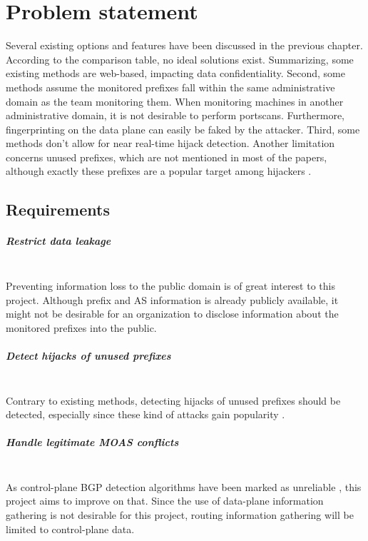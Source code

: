 \chapter{Problem statement}\label{ch:problem}
Several existing options and features have been discussed in the previous chapter. According to the comparison table, no ideal solutions exist. Summarizing, some existing methods are web-based, impacting data confidentiality. Second, some methods assume the monitored prefixes fall within the same administrative domain as the team monitoring them. When monitoring machines in another administrative domain, it is not desirable to perform portscans. Furthermore, fingerprinting on the data plane can easily be faked by the attacker. Third, some methods don't allow for near real-time hijack detection. Another limitation concerns unused prefixes, which are not mentioned in most of the papers, although exactly these prefixes are a popular target among hijackers \cite{vervier2015mind}. 

\section{Requirements}\label{sec:requirements}
\paragraph{Restrict data leakage}\mbox{}\\
Preventing information loss to the public domain is of great interest to this project. Although prefix and AS information is already publicly available, it might not be desirable for an organization to disclose information about the monitored prefixes into the public.

\paragraph{Detect hijacks of unused prefixes}\label{par:requnused}\mbox{}\\
Contrary to existing methods, detecting hijacks of unused prefixes should be detected, especially since these kind of attacks gain popularity \cite{vervier2015mind}.

\paragraph{Handle legitimate MOAS conflicts}\label{par:legitmoas}\mbox{}\\
As control-plane BGP detection algorithms have been marked as unreliable \cite{zhang2008ispy,shi2012detecting}, this project aims to improve on that. Since the use of data-plane information gathering is not desirable for this project, routing information gathering will be limited to control-plane data.

